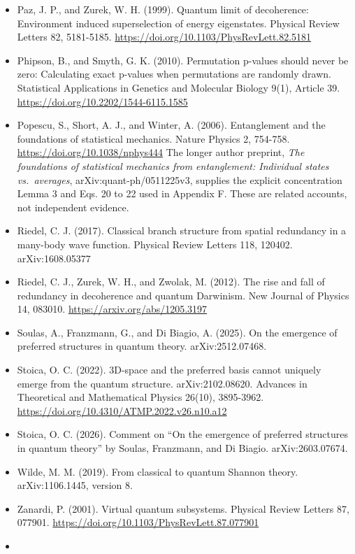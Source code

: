 \documentclass[
  10pt,
  a4paper,
]{article}
\begin{document}
\begin{itemize}
\item
  Paz, J. P., and Zurek, W. H. (1999). Quantum limit of decoherence:
  Environment induced superselection of energy eigenstates. Physical
  Review Letters 82, 5181-5185.
  \url{https://doi.org/10.1103/PhysRevLett.82.5181}
\item
  Phipson, B., and Smyth, G. K. (2010). Permutation p-values should
  never be zero: Calculating exact p-values when permutations are
  randomly drawn. Statistical Applications in Genetics and Molecular
  Biology 9(1), Article 39. \url{https://doi.org/10.2202/1544-6115.1585}
\item
  Popescu, S., Short, A. J., and Winter, A. (2006). Entanglement and the
  foundations of statistical mechanics. Nature Physics 2, 754-758.
  \url{https://doi.org/10.1038/nphys444} The longer author preprint,
  \emph{The foundations of statistical mechanics from entanglement:
  Individual states vs.~averages}, arXiv:quant-ph/0511225v3, supplies
  the explicit concentration Lemma 3 and Eqs. 20 to 22 used in Appendix
  F. These are related accounts, not independent evidence.
\item
  Riedel, C. J. (2017). Classical branch structure from spatial
  redundancy in a many-body wave function. Physical Review Letters 118,
  120402. arXiv:1608.05377
\item
  Riedel, C. J., Zurek, W. H., and Zwolak, M. (2012). The rise and fall
  of redundancy in decoherence and quantum Darwinism. New Journal of
  Physics 14, 083010. \url{https://arxiv.org/abs/1205.3197}
\item
  Soulas, A., Franzmann, G., and Di Biagio, A. (2025). On the emergence
  of preferred structures in quantum theory. arXiv:2512.07468.
\item
  Stoica, O. C. (2022). 3D-space and the preferred basis cannot uniquely
  emerge from the quantum structure. arXiv:2102.08620. Advances in
  Theoretical and Mathematical Physics 26(10), 3895-3962.
  \url{https://doi.org/10.4310/ATMP.2022.v26.n10.a12}
\item
  Stoica, O. C. (2026). Comment on ``On the emergence of preferred
  structures in quantum theory'' by Soulas, Franzmann, and Di Biagio.
  arXiv:2603.07674.
\item
  Wilde, M. M. (2019). From classical to quantum Shannon theory.
  arXiv:1106.1445, version 8.
\item
  Zanardi, P. (2001). Virtual quantum subsystems. Physical Review
  Letters 87, 077901.
  \url{https://doi.org/10.1103/PhysRevLett.87.077901}
\item

\end{itemize}
\end{document}
